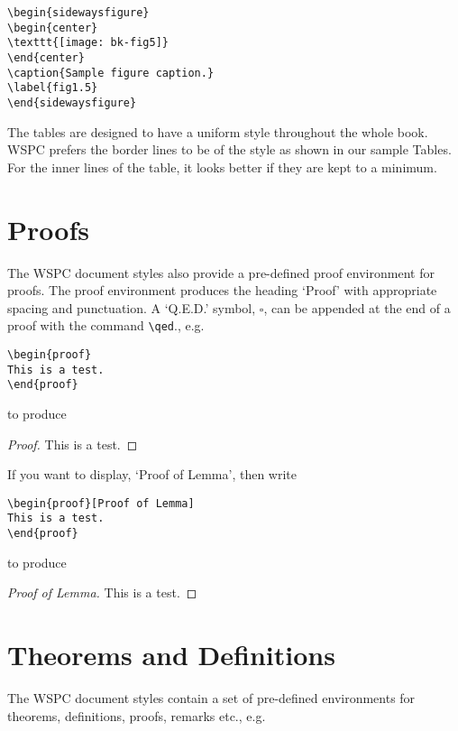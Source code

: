 \begin{verbatim}
\begin{sidewaysfigure}
\begin{center}
\texttt{[image: bk-fig5]}
\end{center}
\caption{Sample figure caption.}
\label{fig1.5}
\end{sidewaysfigure}
\end{verbatim}

The tables are designed to have a uniform style throughout the whole
book. WSPC prefers the border lines to be of the style as shown in our
sample Tables. For the inner lines of the table, it looks better if
they are kept to a minimum.

\section{Proofs}
The WSPC document styles also provide a pre-defined proof
environment for proofs. The proof environment produces the heading
`Proof' with appropriate spacing and punctuation. A `Q.E.D.' symbol,
$\square$, can be appended at the end of a proof with the command
\verb|\qed|., e.g.

\begin{verbatim}
\begin{proof}
This is a test.
\end{proof}
\end{verbatim}

\noindent to produce

\begin{proof}
This is a test.
\end{proof}

If you want to display, `Proof of Lemma', then write

\begin{verbatim}
\begin{proof}[Proof of Lemma]
This is a test.
\end{proof}
\end{verbatim}

\noindent to produce

\begin{proof}[Proof of Lemma]
This is a test.
\end{proof}

\section{Theorems and Definitions}
The WSPC document styles contain a set of pre-defined
environments for theorems, definitions, proofs, remarks etc., e.g.

